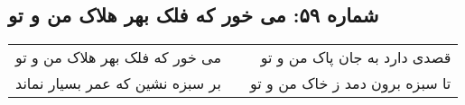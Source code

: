 \begin{center}
\section*{شماره ۵۹: می خور که فلک بهر هلاک من و تو}
\label{sec:059}
\begin{longtable}{l p{0.5cm} r}
می خور که فلک بهر هلاک من و تو
&&
قصدی دارد به جان پاک من و تو
\\
بر سبزه نشین که عمر بسیار نماند
&&
تا سبزه برون دمد ز خاک من و تو
\\
\end{longtable}
\end{center}
